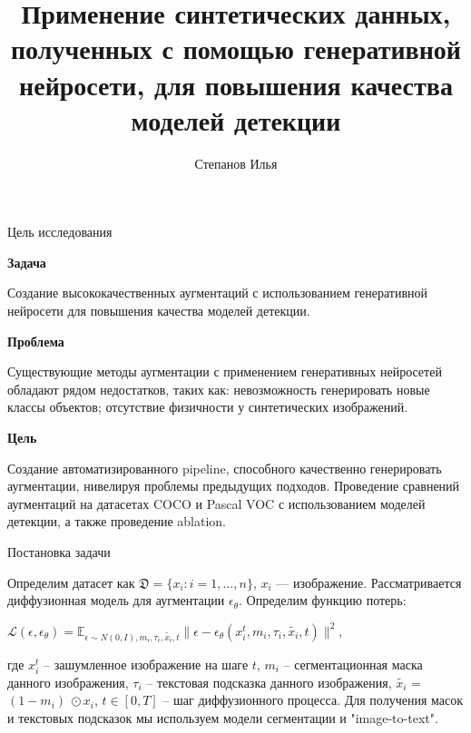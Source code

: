 \documentclass{beamer}
\title[\hbox to 56mm{Генерация}]{Применение синтетических данных, полученных с помощью генеративной нейросети, для повышения качества моделей детекции}
\author[N.\,P.~Ivkin]{Степанов Илья}
\institute{Московский физико-технический институт}
\date{\footnotesize
\par\smallskip\emph{Курс:} НИР
\par\smallskip\emph{Научный руководитель:} Грабовой Андрей Валерьевич
\par\smallskip\emph{Консультант:} Филатов Андрей Викторович
\par\bigskip\small 2024}
\begin{document}
\begin{frame}
\thispagestyle{empty}
\maketitle
\end{frame}
\begin{frame}{Цель исследования}


\textbf{Задача} 

Создание высококачественных аугментаций с использованием генеративной нейросети для повышения качества моделей детекции.

\vspace{5pt} %

\textbf{Проблема} 

Существующие методы аугментации с применением генеративных нейросетей обладают рядом недостатков, таких как: невозможность генерировать новые классы объектов; отсутствие физичности у синтетических изображений.

\vspace{5pt} %

\textbf{Цель} 

Создание автоматизированного pipeline, способного качественно генерировать аугментации, нивелируя проблемы предыдущих подходов. Проведение сравнений аугментаций на датасетах COCO и Pascal VOC с использованием моделей детекции, а также проведение ablation.

\end{frame}
\begin{frame}{Постановка задачи}

{\small Определим датасет как $ \mathfrak{D}=\{ {x}_{i}: i = 1, \dots, n\}$, ${x}_{i}$ --- изображение. Рассматривается диффузионная модель для аугментации $\epsilon_{\theta}$. Определим функцию потерь:
\begin{center}
    $\mathcal{L}(\epsilon, \epsilon_{\theta}) = \mathbb{E}_{\epsilon \sim N(0, I), m_i, \tau_i, \tilde{x_i}, t} \|\epsilon - \epsilon_{\theta}(x^t_i, m_i,\tau_i, \tilde{x_i}, t)\|^2,$
\end{center}
где $x^t_i$ -- зашумленное изображение на шаге $t$, $m_i$ -- сегментационная маска данного изображения, $\tau_i$ -- текстовая подсказка данного изображения,
$\tilde{x_i}$ = $(1 - m_i) \ \odot x_i$, $t \in [0, T]$ -- шаг диффузионного процесса. Для получения масок и текстовых подсказок мы используем модели сегментации и "image-to-text".
}

\end{frame}
\end{document}
